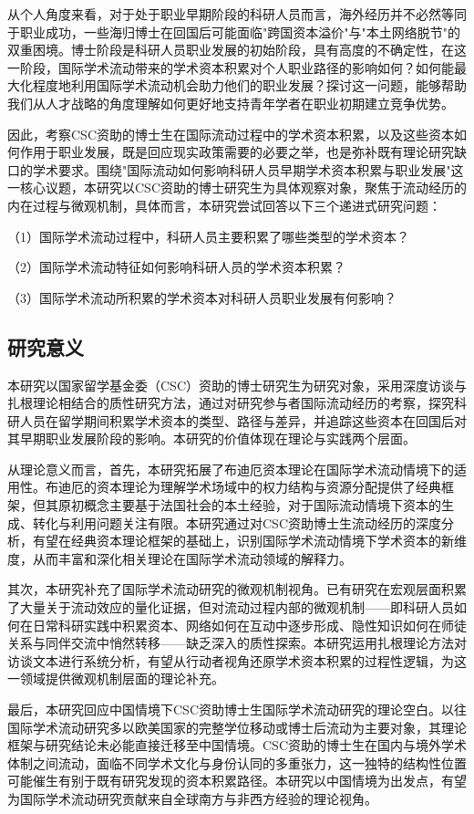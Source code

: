 从个人角度来看，对于处于职业早期阶段的科研人员而言，海外经历并不必然等同于职业成功，一些海归博士在回国后可能面临"跨国资本溢价"与"本土网络脱节"的双重困境。博士阶段是科研人员职业发展的初始阶段，具有高度的不确定性，在这一阶段，国际学术流动带来的学术资本积累对个人职业路径的影响如何？如何能最大化程度地利用国际学术流动机会助力他们的职业发展？探讨这一问题，能够帮助我们从人才战略的角度理解如何更好地支持青年学者在职业初期建立竞争优势。

因此，考察CSC资助的博士生在国际流动过程中的学术资本积累，以及这些资本如何作用于职业发展，既是回应现实政策需要的必要之举，也是弥补既有理论研究缺口的学术要求。围绕"国际流动如何影响科研人员早期学术资本积累与职业发展"这一核心议题，本研究以CSC资助的博士研究生为具体观察对象，聚焦于流动经历的内在过程与微观机制，具体而言，本研究尝试回答以下三个递进式研究问题：

（1）国际学术流动过程中，科研人员主要积累了哪些类型的学术资本？

（2）国际学术流动特征如何影响科研人员的学术资本积累？

（3）国际学术流动所积累的学术资本对科研人员职业发展有何影响？

\subsection{研究意义}

本研究以国家留学基金委（CSC）资助的博士研究生为研究对象，采用深度访谈与扎根理论相结合的质性研究方法，通过对研究参与者国际流动经历的考察，探究科研人员在留学期间积累学术资本的类型、路径与差异，并追踪这些资本在回国后对其早期职业发展阶段的影响。本研究的价值体现在理论与实践两个层面。

从理论意义而言，首先，本研究拓展了布迪厄资本理论在国际学术流动情境下的适用性。布迪厄的资本理论为理解学术场域中的权力结构与资源分配提供了经典框架，但其原初概念主要基于法国社会的本土经验，对于国际流动情境下资本的生成、转化与利用问题关注有限。本研究通过对CSC资助博士生流动经历的深度分析，有望在经典资本理论框架的基础上，识别国际学术流动情境下学术资本的新维度，从而丰富和深化相关理论在国际学术流动领域的解释力。

其次，本研究补充了国际学术流动研究的微观机制视角。已有研究在宏观层面积累了大量关于流动效应的量化证据，但对流动过程内部的微观机制——即科研人员如何在日常科研实践中积累资本、网络如何在互动中逐步形成、隐性知识如何在师徒关系与同伴交流中悄然转移——缺乏深入的质性探索。本研究运用扎根理论方法对访谈文本进行系统分析，有望从行动者视角还原学术资本积累的过程性逻辑，为这一领域提供微观机制层面的理论补充。

最后，本研究回应中国情境下CSC资助博士生国际学术流动研究的理论空白。以往国际学术流动研究多以欧美国家的完整学位移动或博士后流动为主要对象，其理论框架与研究结论未必能直接迁移至中国情境。CSC资助的博士生在国内与境外学术体制之间流动，面临不同学术文化与身份认同的多重张力，这一独特的结构性位置可能催生有别于既有研究发现的资本积累路径。本研究以中国情境为出发点，有望为国际学术流动研究贡献来自全球南方与非西方经验的理论视角。

